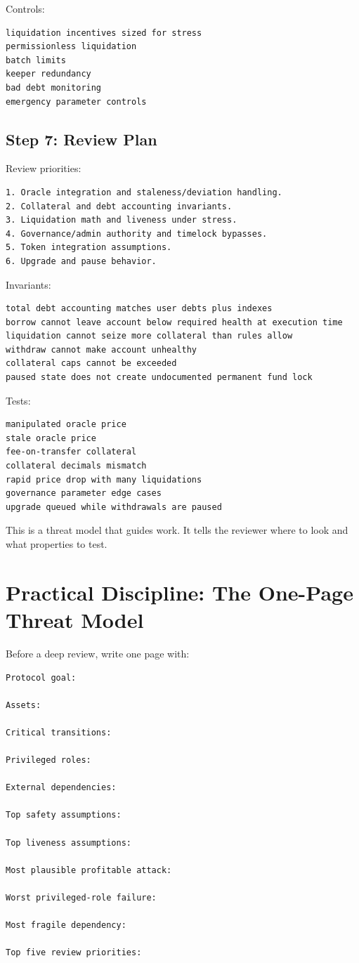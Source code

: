 Controls:

\begin{lstlisting}
liquidation incentives sized for stress
permissionless liquidation
batch limits
keeper redundancy
bad debt monitoring
emergency parameter controls
\end{lstlisting}

\subsection{Step 7: Review Plan}

Review priorities:

\begin{lstlisting}
1. Oracle integration and staleness/deviation handling.
2. Collateral and debt accounting invariants.
3. Liquidation math and liveness under stress.
4. Governance/admin authority and timelock bypasses.
5. Token integration assumptions.
6. Upgrade and pause behavior.
\end{lstlisting}

Invariants:

\begin{lstlisting}
total debt accounting matches user debts plus indexes
borrow cannot leave account below required health at execution time
liquidation cannot seize more collateral than rules allow
withdraw cannot make account unhealthy
collateral caps cannot be exceeded
paused state does not create undocumented permanent fund lock
\end{lstlisting}

Tests:

\begin{lstlisting}
manipulated oracle price
stale oracle price
fee-on-transfer collateral
collateral decimals mismatch
rapid price drop with many liquidations
governance parameter edge cases
upgrade queued while withdrawals are paused
\end{lstlisting}

This is a threat model that guides work. It tells the reviewer where to
look and what properties to test.

\section{Practical Discipline: The One-Page Threat Model}

Before a deep review, write one page with:

\begin{lstlisting}
Protocol goal:

Assets:

Critical transitions:

Privileged roles:

External dependencies:

Top safety assumptions:

Top liveness assumptions:

Most plausible profitable attack:

Worst privileged-role failure:

Most fragile dependency:

Top five review priorities:
\end{lstlisting}

